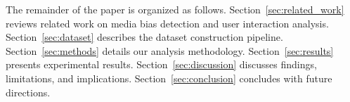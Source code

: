 The remainder of the paper is organized as follows.
Section~\ref{sec:related_work} reviews related work on media bias detection and user interaction analysis.
Section~\ref{sec:dataset} describes the dataset construction pipeline.
Section~\ref{sec:methods} details our analysis methodology.
Section~\ref{sec:results} presents experimental results.
Section~\ref{sec:discussion} discusses findings, limitations, and implications.
Section~\ref{sec:conclusion} concludes with future directions.
